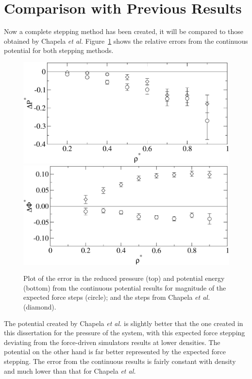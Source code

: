 \documentclass[12pt]{UoAthesis} \usepackage{booktabs}
\begin{document}
\section{Comparison with Previous Results}

Now a complete stepping method has been created, it will be compared
to those obtained by Chapela \textit{et al.}
Figure~\ref{fig:ChapelaComp} shows the relative errors from the
continuous potential for both stepping methods.

\begin{figure}[htp] 
  \begin{center}
    \includegraphics[clip,scale=0.45]{figures/ChapelaCompP} 
    \includegraphics[clip,scale=0.45]{figures/ChapelaCompU} 
    \caption[Comparison of results between previous work and this
    dissertations steps]
    {Plot of the error in the reduced pressure (top) and potential
      energy (bottom) from the continuous potential results for
      magnitude of the expected force steps (circle); and the steps
      from Chapela \textit{et al.} (diamond).}
    \label{fig:ChapelaComp}
  \end{center}
\end{figure}

The potential created by Chapela \textit{et al.} is slightly better
that the one created in this dissertation for the pressure of the
system, with this expected force stepping deviating from the
force-driven simulators results at lower densities.  The potential on
the other hand is far better represented by the expected force
stepping.  The error from the continuous results is fairly constant
with density and much lower than that for Chapela \textit{et al.}  
\end{document}
